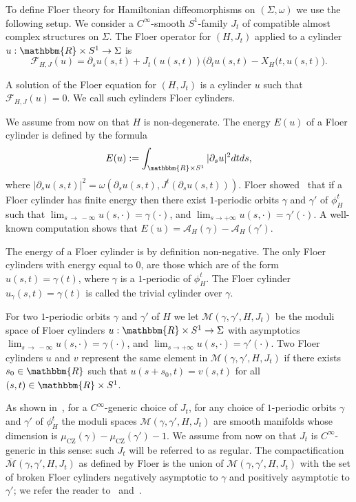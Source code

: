 \documentclass[AHL,Unicode,longabstracts,published]{cedram}
\newcommand{\R}{\mathbbm{R}}
\newcommand{\rCZ}{\mathrm{CZ}}
\newcommand{\clA}{\mathcal{A}}
\newcommand{\clF}{\mathcal{F}}
\newcommand{\clM}{\mathcal{M}}
\begin{document}
To define Floer theory for Hamiltonian diffeomorphisms on $(\Sigma,\omega)$ we use the following setup. We consider a $C^\infty$-smooth $S^1$-family $J_t$ of compatible almost complex structures on $\Sigma$. The Floer operator for $(H,J_t)$ applied to a cylinder $u: \R \times S^1 \to \Sigma$ is
\begin{equation}\label{eq:defFloereq}
\clF_{{H},J}(u) = \partial_s u(s,t) + J_t(u(s,t))\big(\partial_t u (s,t) - X_{{H}}(t,u(s,t)\big).
\end{equation}

A solution of the Floer equation for $(H,J_t)$ is a cylinder $u$ such that \linebreak $ \clF_{{H},J}(u)=0$. We call such cylinders Floer cylinders.

We assume from now on that $H$ is non-degenerate.
The energy ${E}(u)$ of a Floer cylinder is defined by the formula
\[
E(u):= \int_{\R \times S^1}|\partial_s u |^2 dt ds,
\]
where $ |\partial_s u(s,t) |^2 = \omega(\partial_s u(s,t), J^t (\partial_s u(s,t)))$. Floer showed~\cite{Floer} that if a Floer cylinder has finite energy then there exist $1$-periodic orbits $\gamma$ and $\gamma'$ of $\phi^t_H$ such that $
\lim_{s\,\to\,-\infty}u(s,\cdot) = \gamma(\cdot)$, and $\lim_{s\to +\infty}u(s,\cdot) = \gamma'(\cdot)$. A well-known computation shows that $E(u) = \clA_H(\gamma) - \clA_H(\gamma') $.

The energy of a Floer cylinder is by definition non-negative. The only Floer cylinders with energy equal to $0$, are those which are of the form $u(s,t)= \gamma(t)$, where $\gamma$ is a $1$-periodic of $\phi^t_H$. The Floer cylinder $u_\gamma(s,t)= \gamma(t)$ is called the trivial cylinder over $\gamma$.


For two $1$-periodic orbits $\gamma$ and $\gamma'$ of ${H}$ we let $\clM(\gamma, \gamma', {H},J_t)$ be the moduli space of Floer cylinders $u: \R \times S^1 \to \Sigma$ with asymptotics $
\lim_{s\,\to\,-\infty}u(s,\cdot) = \gamma(\cdot)$, and $\lim_{s\to +\infty}u(s,\cdot) = \gamma'(\cdot)$. Two Floer cylinders $u$ and $v$ represent the same element in $\clM(\gamma, \gamma', {H},J_t)$ if there exists $s_0 \in \R $ such that $u(s+s_0, t) = v(s,t)$ for all $(s,t) \in \R \times S^1$.



As shown in~\cite{FHS}, for a $C^\infty$-generic choice of $J_t$, for any choice of $1$-periodic orbits $\gamma$ and $\gamma'$ of $\phi^t_H$ the moduli spaces $\clM(\gamma, \gamma', {H},J_t)$ are smooth manifolds whose dimension is $\mu_{\rCZ}(\gamma) - \mu_{\rCZ}(\gamma') - 1$. We assume from now on that $J_t$ is $C^\infty$-generic in this sense: such $J_t$ will be referred to as regular. The compactification $\overline{\clM}(\gamma, \gamma', {H},J_t)$ as defined by Floer is the union of $\clM(\gamma, \gamma', {H},J_t)$ with the set of broken Floer cylinders negatively asymptotic to $\gamma$ and positively asymptotic to $\gamma'$; we refer the reader to~\cite{AD} and~\cite{Floer}.
\end{document}
